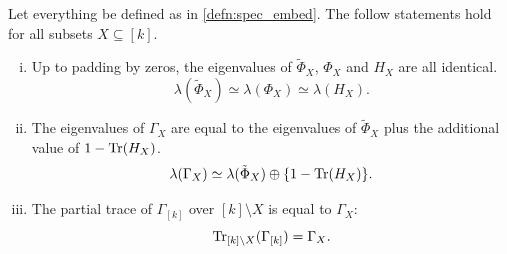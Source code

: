 \documentclass[notitlepage, 10pt]{article}
\begin{document}
\begin{lem}
    \label{lem:spec_embed}
    Let everything be defined as in \cref{defn:spec_embed}.
    The follow statements hold for all subsets $X \subseteq [k]$.
    \begin{enumerate}[(i)]
        \item Up to padding by zeros, the eigenvalues of $\tilde \Phi_{X}$, $\Phi_{X}$ and $H_{X}$ are all identical.
        \begin{equation}
            \lambda(\tilde \Phi_{X}) \simeq \lambda(\Phi_X) \simeq \lambda(H_X).
        \end{equation}
        \item The eigenvalues of $\Gamma_{X}$ are equal to the eigenvalues of $\tilde \Phi_{X}$ plus the additional value of $1-\operatorname{Tr}(H_{X})$.
        \begin{equation}
            \lambda(\Gamma_{X}) \simeq \lambda(\tilde \Phi_{X}) \oplus \{1-\operatorname{Tr}(H_{X})\}.
        \end{equation}
        \item The partial trace of $\Gamma_{[k]}$ over $[k]\setminus X$ is equal to $\Gamma_{X}$:
        \begin{equation}
            \operatorname{Tr}_{[k]\setminus X} (\Gamma_{[k]}) = \Gamma_{X}.
        \end{equation}
    \end{enumerate}
\end{lem}
\end{document}
